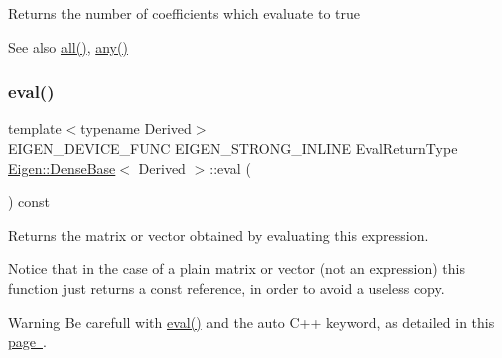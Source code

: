 \begin{DoxyReturn}{Returns}
the number of coefficients which evaluate to true
\end{DoxyReturn}
\begin{DoxySeeAlso}{See also}
\mbox{\hyperlink{class_eigen_1_1_dense_base_ae42ab60296c120e9f45ce3b44e1761a4}{all()}}, \mbox{\hyperlink{class_eigen_1_1_dense_base_abfbf4cb72dd577e62fbe035b1c53e695}{any()}} 
\end{DoxySeeAlso}
\mbox{\label{class_eigen_1_1_dense_base_a5df64c66228ba75bbc66db2584185527}} 
\subsubsection{\texorpdfstring{eval()}{eval()}}
{\footnotesize\ttfamily template$<$typename Derived$>$ \\
E\+I\+G\+E\+N\+\_\+\+D\+E\+V\+I\+C\+E\+\_\+\+F\+U\+NC E\+I\+G\+E\+N\+\_\+\+S\+T\+R\+O\+N\+G\+\_\+\+I\+N\+L\+I\+NE Eval\+Return\+Type \mbox{\hyperlink{class_eigen_1_1_dense_base}{Eigen\+::\+Dense\+Base}}$<$ Derived $>$\+::eval (\begin{DoxyParamCaption}{ }\end{DoxyParamCaption}) const\hspace{0.3cm}{\ttfamily [inline]}}

\begin{DoxyReturn}{Returns}
the matrix or vector obtained by evaluating this expression.
\end{DoxyReturn}
Notice that in the case of a plain matrix or vector (not an expression) this function just returns a const reference, in order to avoid a useless copy.

\begin{DoxyWarning}{Warning}
Be carefull with \mbox{\hyperlink{class_eigen_1_1_dense_base_a5df64c66228ba75bbc66db2584185527}{eval()}} and the auto C++ keyword, as detailed in this \mbox{\hyperlink{}{page }}. 
\end{DoxyWarning}
\mbox{\label{class_eigen_1_1_dense_base_a4f5eb49e80db57f79a8353ecdf811418}} 
